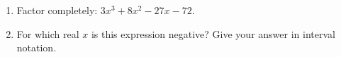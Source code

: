 \begin{enumerate}
\item[(a)] Factor completely: $3x^3+8x^2-27x-72$.
\item[(b)] For which real $x$ is this expression negative? Give your answer in interval notation.
\end{enumerate}
